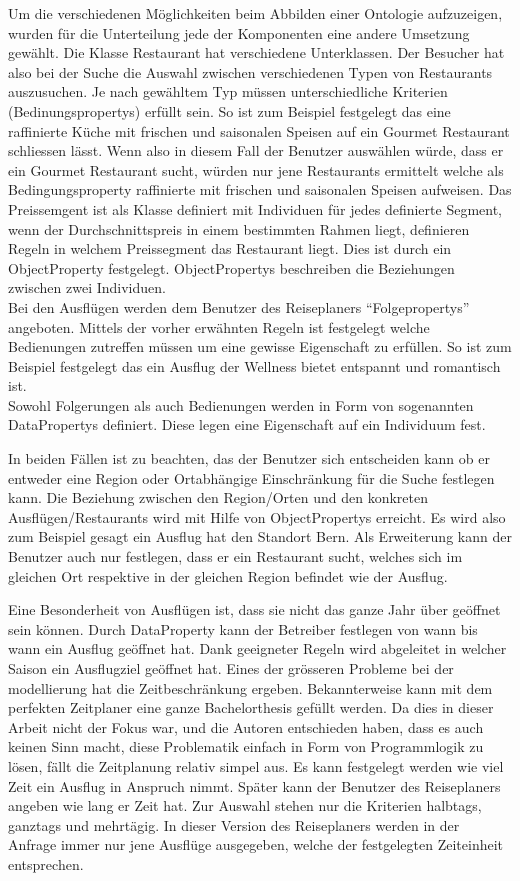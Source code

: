 Um die verschiedenen Möglichkeiten beim Abbilden einer Ontologie aufzuzeigen, wurden für die Unterteilung jede der Komponenten eine andere Umsetzung gewählt. Die Klasse Restaurant hat verschiedene Unterklassen. Der Besucher hat also bei der Suche die Auswahl zwischen verschiedenen Typen von Restaurants auszusuchen. Je nach gewähltem Typ müssen unterschiedliche Kriterien (Bedinungspropertys) erfüllt sein. So ist zum Beispiel festgelegt das eine raffinierte Küche mit frischen und saisonalen Speisen auf ein Gourmet Restaurant schliessen lässt. Wenn also in diesem Fall der Benutzer auswählen würde, dass er ein Gourmet Restaurant sucht, würden nur jene Restaurants ermittelt welche als Bedingungsproperty raffinierte mit frischen und saisonalen Speisen aufweisen.  Das Preissemgent ist als Klasse definiert mit Individuen für jedes definierte Segment, wenn der Durchschnittspreis in einem bestimmten Rahmen liegt, definieren Regeln in welchem Preissegment das Restaurant liegt.  Dies ist durch ein ObjectProperty festgelegt. ObjectPropertys beschreiben die Beziehungen zwischen zwei Individuen.\\ 
Bei den Ausflügen werden dem Benutzer des Reiseplaners "`Folgepropertys"' angeboten. Mittels der vorher erwähnten Regeln ist festgelegt welche Bedienungen zutreffen müssen um eine gewisse Eigenschaft zu erfüllen. So ist zum Beispiel festgelegt das ein Ausflug der Wellness bietet entspannt und romantisch ist.\\ Sowohl Folgerungen als auch Bedienungen werden in Form von sogenannten DataPropertys definiert. Diese legen eine Eigenschaft auf ein Individuum fest.

In beiden Fällen ist zu beachten, das der Benutzer sich entscheiden kann ob er entweder eine Region oder Ortabhängige Einschränkung für die Suche festlegen kann. Die Beziehung zwischen den Region/Orten und den konkreten Ausflügen/Restaurants wird mit Hilfe von ObjectPropertys erreicht. Es wird also zum Beispiel gesagt ein Ausflug hat den Standort Bern. Als Erweiterung kann der Benutzer auch nur festlegen, dass er ein Restaurant sucht, welches sich im gleichen Ort respektive in der gleichen Region befindet wie der Ausflug.

Eine Besonderheit von Ausflügen ist, dass sie nicht das ganze Jahr über geöffnet sein können. Durch DataProperty kann der Betreiber festlegen von wann bis wann ein Ausflug geöffnet hat. Dank geeigneter Regeln wird abgeleitet in welcher Saison ein Ausflugziel geöffnet hat. Eines der grösseren Probleme bei der modellierung hat die Zeitbeschränkung ergeben. Bekannterweise kann mit dem perfekten Zeitplaner eine ganze Bachelorthesis gefüllt werden. Da dies in dieser Arbeit nicht der Fokus war, und die Autoren entschieden haben, dass es auch keinen Sinn macht, diese Problematik einfach in Form von Programmlogik zu lösen, fällt die Zeitplanung relativ simpel aus. Es kann festgelegt werden wie viel Zeit ein Ausflug in Anspruch nimmt. Später kann der Benutzer des Reiseplaners angeben wie lang er Zeit hat. Zur Auswahl stehen nur die Kriterien halbtags, ganztags und mehrtägig. In dieser Version des Reiseplaners werden in der Anfrage immer nur jene Ausflüge ausgegeben, welche der festgelegten Zeiteinheit entsprechen.


